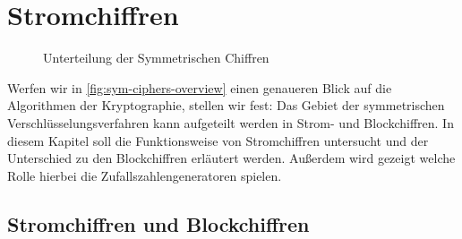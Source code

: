 \chapter{Stromchiffren}

\begin{figure}[h]
  \begin{center}


  \end{center}
  \caption{Unterteilung der Symmetrischen Chiffren \parencite[29]{BOOK:crypto}}
  \label{fig:sym-ciphers-overview}
\end{figure}

\noindent
Werfen wir in \autoref{fig:sym-ciphers-overview} einen genaueren Blick auf die Algorithmen
der Kryptographie, stellen wir fest: Das Gebiet
der symmetrischen Verschlüsselungsverfahren kann aufgeteilt werden in Strom- und Blockchiffren.
In diesem Kapitel soll die Funktionsweise von Stromchiffren untersucht und der Unterschied zu
den Blockchiffren erläutert werden. Außerdem wird gezeigt welche
Rolle hierbei die Zufallszahlengeneratoren spielen.

\section{Stromchiffren und Blockchiffren}